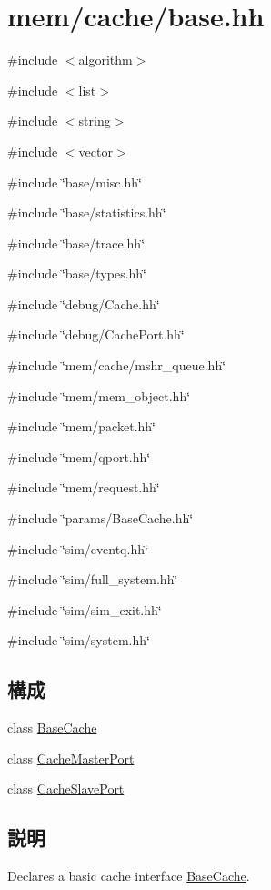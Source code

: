 \hypertarget{mem_2cache_2base_8hh}{
\section{mem/cache/base.hh}
\label{mem_2cache_2base_8hh}
}
{\ttfamily \#include $<$algorithm$>$}\par
{\ttfamily \#include $<$list$>$}\par
{\ttfamily \#include $<$string$>$}\par
{\ttfamily \#include $<$vector$>$}\par
{\ttfamily \#include \char`\"{}base/misc.hh\char`\"{}}\par
{\ttfamily \#include \char`\"{}base/statistics.hh\char`\"{}}\par
{\ttfamily \#include \char`\"{}base/trace.hh\char`\"{}}\par
{\ttfamily \#include \char`\"{}base/types.hh\char`\"{}}\par
{\ttfamily \#include \char`\"{}debug/Cache.hh\char`\"{}}\par
{\ttfamily \#include \char`\"{}debug/CachePort.hh\char`\"{}}\par
{\ttfamily \#include \char`\"{}mem/cache/mshr\_\-queue.hh\char`\"{}}\par
{\ttfamily \#include \char`\"{}mem/mem\_\-object.hh\char`\"{}}\par
{\ttfamily \#include \char`\"{}mem/packet.hh\char`\"{}}\par
{\ttfamily \#include \char`\"{}mem/qport.hh\char`\"{}}\par
{\ttfamily \#include \char`\"{}mem/request.hh\char`\"{}}\par
{\ttfamily \#include \char`\"{}params/BaseCache.hh\char`\"{}}\par
{\ttfamily \#include \char`\"{}sim/eventq.hh\char`\"{}}\par
{\ttfamily \#include \char`\"{}sim/full\_\-system.hh\char`\"{}}\par
{\ttfamily \#include \char`\"{}sim/sim\_\-exit.hh\char`\"{}}\par
{\ttfamily \#include \char`\"{}sim/system.hh\char`\"{}}\par
\subsection*{構成}
\begin{DoxyCompactItemize}
\item 
class \hyperlink{classBaseCache}{BaseCache}
\item 
class \hyperlink{classBaseCache_1_1CacheMasterPort}{CacheMasterPort}
\item 
class \hyperlink{classBaseCache_1_1CacheSlavePort}{CacheSlavePort}
\end{DoxyCompactItemize}


\subsection{説明}
Declares a basic cache interface \hyperlink{classBaseCache}{BaseCache}. 